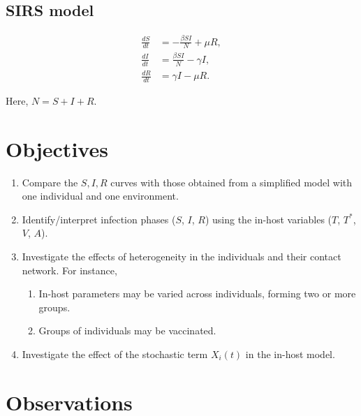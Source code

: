 \documentclass[11pt]{article}
\numberwithin{equation}{subsection}
\begin{document}
    \subsection{SIRS model} \label{model:SIRS}

    \begin{align}
        \frac{dS}{dt} &= -\frac{\beta SI}{N} + \mu R, \\
        \frac{dI}{dt} &= \frac{\beta SI}{N} - \gamma I, \\
        \frac{dR}{dt} &= \gamma I - \mu R.
    \end{align}

    Here, $N = S + I + R$.


    \section{Objectives}

    \begin{enumerate}
        \item Compare the $S, I, R$ curves with those obtained from a
        simplified model with one individual and one environment.

        \item Identify/interpret infection phases ($S$, $I$, $R$) using the
        in-host variables ($T$, $T^*$, $V$, $A$).

        \item Investigate the effects of heterogeneity in the individuals and
        their contact network. For instance,
        \begin{enumerate}
            \item In-host parameters may be varied across individuals, forming
            two or more groups.
            \item Groups of individuals may be vaccinated.
        \end{enumerate}

        \item Investigate the effect of the stochastic term $X_i(t)$ in the
        in-host model.
    \end{enumerate}


    \section{Observations}
\end{document}
